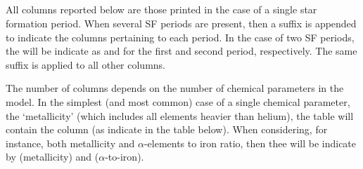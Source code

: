 \documentclass[a4paper,11pt,twoside]{article}
\begin{document}

\subsection{}

All columns reported below are those printed in the case of a single star formation period. When several SF periods are present, then a suffix is appended to indicate the columns pertaining to each period. In the case of two SF periods, the  will be indicate as  and   for the first and second period, respectively. The same suffix is applied to all other columns.

The number of  columns depends on the number of chemical parameters in the model. In the simplest (and most common) case of a single chemical parameter, the `metallicity' (which includes all elements heavier than helium), the table will contain the column  (as indicate in the table below). When considering, for instance, both metallicity and $\alpha$-elements to iron ratio, then thee will be indicate by   (metallicity) and   ($\alpha$-to-iron).
\end{document}
